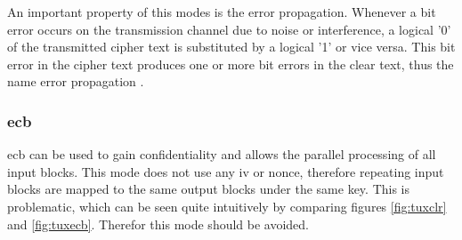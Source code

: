 An important property of this modes is the error propagation.
Whenever a bit error occurs on the transmission channel due to noise or interference,
a logical '0' of the transmitted cipher text is substituted by a logical '1' or vice versa. This bit error in the cipher text produces one or more bit errors
in the clear text, thus the name error propagation \cite{burda}.

\subsubsection{\gls{ecb}}

\gls{ecb} can be used to gain confidentiality and allows the parallel processing of all input blocks. This mode does not use any \gls{iv} or nonce, therefore
repeating input blocks are mapped to the same output blocks under the same key. This is problematic, which can be seen quite intuitively by comparing 
figures \ref{fig:tuxclr} and \ref{fig:tuxecb}. Therefor this mode should be avoided.

